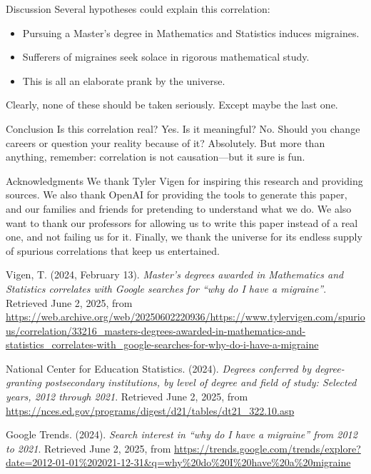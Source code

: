 \documentclass{article}
\begin{document}
\begin{section}{Discussion}
 Several hypotheses could explain this correlation:
 \begin{itemize}
   \item Pursuing a Master's degree in Mathematics and Statistics induces migraines.
   \item Sufferers of migraines seek solace in rigorous mathematical study.
   \item This is all an elaborate prank by the universe.
 \end{itemize}
 Clearly, none of these should be taken seriously. Except maybe the last one.
\end{section}

\begin{section}{Conclusion}
 Is this correlation real? Yes. Is it meaningful? No. Should you change careers or question your reality because of it? Absolutely. But more than anything, remember: correlation is not causation—but it sure is fun.
\end{section}

\begin{section}{Acknowledgments}
 We thank Tyler Vigen for inspiring this research and providing sources. We also thank OpenAI for providing the tools to generate this paper, and our families and friends for pretending to understand what we do.
 We also want to thank our professors for allowing us to write this paper instead of a real one, and not failing us for it. Finally, we thank the universe for its endless supply of spurious correlations that keep us entertained.
\end{section}

\pagebreak

\begin{thebibliography}{9}

  Vigen, T. (2024, February 13). \textit{Master's degrees awarded in Mathematics and Statistics correlates with Google searches for ``why do I have a migraine''}. Retrieved June 2, 2025, from \url{https://web.archive.org/web/20250602220936/https://www.tylervigen.com/spurious/correlation/33216_masters-degrees-awarded-in-mathematics-and-statistics_correlates-with_google-searches-for-why-do-i-have-a-migraine}

  National Center for Education Statistics. (2024). \textit{Degrees conferred by degree-granting postsecondary institutions, by level of degree and field of study: Selected years, 2012 through 2021}. Retrieved June 2, 2025, from \url{https://nces.ed.gov/programs/digest/d21/tables/dt21_322.10.asp}

  Google Trends. (2024). \textit{Search interest in ``why do I have a migraine'' from 2012 to 2021}. Retrieved June 2, 2025, from \url{https://trends.google.com/trends/explore?date=2012-01-01%202021-12-31&q=why%20do%20I%20have%20a%20migraine}


\end{thebibliography}
\end{document}
